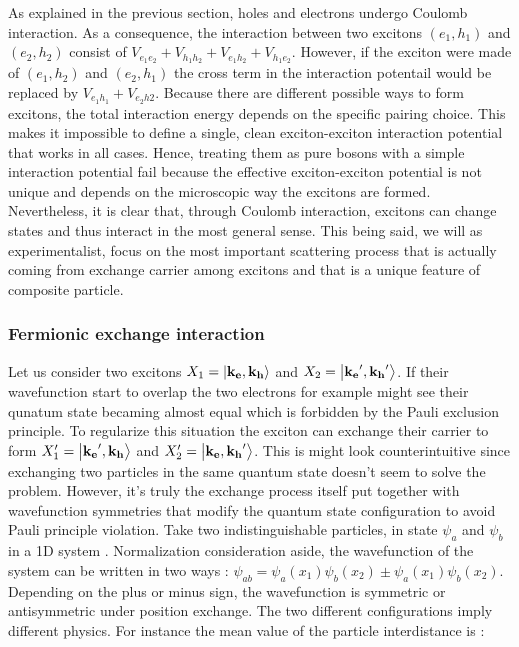 As explained in the previous section, holes and electrons undergo Coulomb interaction. As a consequence, the interaction
between two excitons $(e_1,h_1)$ and $(e_2,h_2)$ consist of $V_{e_1e_2}+V_{h_1h_2}+V_{e_1h_2}+V_{h_1e_2}$. However, if the exciton were made of $(e_1,h_2)$ and $(e_2,h_1)$ the cross term in the interaction potentail would be replaced
by $V_{e_1h_1}+V_{e_2h2}$. Because there are different possible ways to form excitons, the total interaction energy depends on the specific pairing choice.
This makes it impossible to define a single, clean exciton-exciton interaction potential that works in all cases.
Hence, treating them as pure bosons with a simple interaction potential fail because the effective exciton-exciton potential is not unique and depends on the microscopic way the excitons are formed.
Nevertheless, it is clear that, through Coulomb interaction, excitons can change states and thus interact in the most general sense. This being said, we will as experimentalist, focus on the most 
important scattering process that is actually coming from exchange carrier among excitons and that is a unique feature of composite particle.

\subsubsection{Fermionic exchange interaction}

Let us consider two excitons $X_1=\ket{\mathbf{k_e},\mathbf{k_h}}$ and $X_2=\ket{\mathbf{k_e}',\mathbf{k_h}'}$. If their wavefunction
start to overlap the two electrons for example might see their qunatum state becaming almost equal which is forbidden by the Pauli exclusion principle. To regularize this situation 
the exciton can exchange their carrier to form $X'_1=\ket{\mathbf{k_e}',\mathbf{k_h}}$ and $X'_2=\ket{\mathbf{k_e},\mathbf{k_h}'}$. This is might look counterintuitive since exchanging two particles in the same quantum state doesn't seem to solve the problem. However,
it's truly the exchange process itself put together with wavefunction symmetries that modify the quantum state configuration to avoid Pauli principle violation.
Take two indistinguishable particles, in state $\psi_a$ and $\psi_b$ in a 1D system  \cite{CCT_tome2}. Normalization consideration aside, the wavefunction of the system can be written in two ways : $\psi_{ab} =\psi_a(x_1)\psi_b(x_2) \pm \psi_a(x_1)\psi_b(x_2)$.
Depending on the plus or minus sign, the wavefunction is symmetric or antisymmetric under position exchange. The two different configurations imply different physics.
For instance the mean value of the particle interdistance is :

